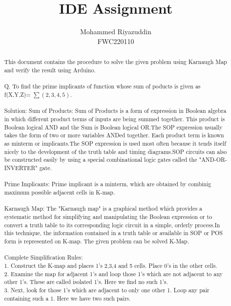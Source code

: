 \documentclass{IEEEtran}
\begin{document}
\title{IDE Assignment}
\author{Mohammed Riyazuddin 
\\ FWC220110}
 \maketitle
 \begin{abstract}
  This document contains the procedure to solve the given problem using Karnaugh Map and verify the result using Arduino.
  \\
  \\Q. To find the prime implicants of function whose sum of poducts is given as f(X,Y,Z)= $\sum (2,3,4,5) $.
 \\
 \\Solution: 
Sum of Products: Sum of Products is a form of expression in Boolean algebra in which different product terms of inputs are being summed together. This product is Boolean logical AND and the Sum is Boolean logical OR.The SOP expression usually takes the form of two or more variables ANDed together. Each product term is known as minterm or implicants.The SOP expression is used most often because it tends itself nicely to the development of the truth table and timing diagrams.SOP circuits can also be constructed easily by using a special combinational logic gates called the "AND-OR-INVERTER" gate.
\\    
\\Prime Implicants: Prime implicant is a minterm, which are obtained by combinig maximum possible adjacent cells in K-map.
\\
\\ Karnaugh Map: The "Karnaugh map" is a graphical method which provides a systematic method for simplifying and manipulating the Boolean expression or to convert a truth table to its corresponding logic circuit in a simple, orderly process.In this technique, the information contained in a truth table or available in SOP or POS form is represented on K-map. The given problem can be solved K-Map.
\\ 
\\ Complete Simplification Rules:
\\1. Construct the K-map and places 1's 2,3,4 and 5 cells. Place 0's in the other cells.
\\2. Examine the map for adjacent 1's and loop those 1's which are not adjacent to any other 1's. These are called isolated 1's. Here we find no such 1's.
 \\3. Next, look for those 1's which are adjacent to only one other 1. Loop any pair containing such a 1. Here we have two such pairs.

\end{abstract}
\end{document}
